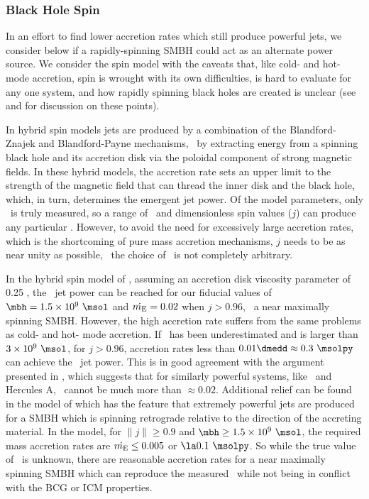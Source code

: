 \documentclass[11pt, preprint]{aastex}
\begin{document}
\subsubsection{Black Hole Spin}

In an effort to find lower accretion rates which still produce
powerful jets, we consider below if a rapidly-spinning SMBH could act
as an alternate power source. We consider the spin model with the
caveats that, like cold- and hot-mode accretion, spin is wrought with
its own difficulties, is hard to evaluate for any one system, and how
rapidly spinning black holes are created is unclear (see
\citealt{msspin} and \citealt{minaspin} for discussion on these
points).

In hybrid spin models \citep[\eg][]{1999ApJ...522..753M,
  2001ApJ...548L...9M, 2006ApJ...651.1023R, 2007MNRAS.377.1652N,
  2009MNRAS.397.1302B, gesspin} jets are produced by a combination of
the Blandford-Znajek \citep{bz} and Blandford-Payne \citep{bp}
mechanisms, \ie\ by extracting energy from a spinning black hole and
its accretion disk via the poloidal component of strong magnetic
fields. In these hybrid models, the accretion rate sets an upper limit
to the strength of the magnetic field that can thread the inner disk
and the black hole, which, in turn, determines the emergent jet
power. Of the model parameters, only \pjet\ is truly measured, so a
range of \dme\ and dimensionless spin values ($j$) can produce any
particular \pjet. However, to avoid the need for excessively large
accretion rates, which is the shortcoming of pure mass accretion
mechanisms, $j$ needs to be as near unity as possible, \ie\ the choice
of \dme\ is not completely arbitrary.

In the hybrid spin model of \citet{2007MNRAS.377.1652N}, assuming an
accretion disk viscosity parameter of 0.25
\citep{1999ApJ...520..298Q}, the \rbs\ jet power can be reached for
our fiducial values of $\mbh = 1.5 \times 10^9 ~\msol$ and $\dot{m_{\rm{E}}} =
0.02$ when $j > 0.96$, \ie\ a near maximally spinning SMBH. However,
the high accretion rate suffers from the same problems as cold- and
hot- mode accretion. If \mbh\ has been underestimated and is larger
than $3 \times 10^9 ~\msol$, for $j > 0.96$, accretion rates less than
$0.01 \dmedd \approx 0.3 ~\msolpy$ can achieve the \rbs\ jet
power. This is in good agreement with the argument presented in
\citet{minaspin}, which suggests that for similarly powerful systems,
like \ms\ and Hercules A, \dme\ cannot be much more than $\approx
0.02$. Additional relief can be found in the model of \citet{gesspin}
which has the feature that extremely powerful jets are produced for a
SMBH which is spinning retrograde relative to the direction of the
accreting material. In the \citet{gesspin} model, for $\|j\| \ge 0.9$
and $\mbh \ge 1.5 \times 10^9 ~\msol$, the required mass accretion
rates are $\dot{m_{\rm{E}}} \le 0.005$ or $\la 0.1 ~\msolpy$. So while the true
value of \dme\ is unknown, there are reasonable accretion rates for a
near maximally spinning SMBH which can reproduce the measured
\pjet\ while not being in conflict with the BCG or ICM properties.
\end{document}
